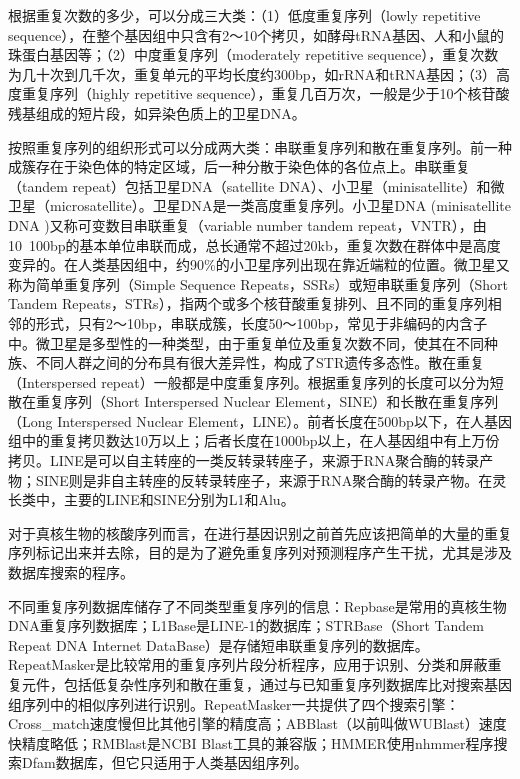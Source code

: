 根据重复次数的多少，可以分成三大类：（1）低度重复序列（lowly repetitive sequence），在整个基因组中只含有2～10个拷贝，如酵母tRNA基因、人和小鼠的珠蛋白基因等；（2）中度重复序列（moderately repetitive sequence），重复次数为几十次到几千次，重复单元的平均长度约300bp，如rRNA和tRNA基因；（3）高度重复序列（highly repetitive sequence），重复几百万次，一般是少于10个核苷酸残基组成的短片段，如异染色质上的卫星DNA。

按照重复序列的组织形式可以分成两大类：串联重复序列和散在重复序列。前一种成簇存在于染色体的特定区域，后一种分散于染色体的各位点上。串联重复（tandem repeat）包括卫星DNA（satellite DNA）、小卫星（minisatellite）和微卫星（microsatellite）。卫星DNA是一类高度重复序列。小卫星DNA (minisatellite DNA )又称可变数目串联重复（variable number tandem repeat，VNTR），由10~100bp的基本单位串联而成，总长通常不超过20kb，重复次数在群体中是高度变异的。在人类基因组中，约90\%的小卫星序列出现在靠近端粒的位置。微卫星又称为简单重复序列（Simple Sequence Repeats，SSRs）或短串联重复序列（Short Tandem Repeats，STRs），指两个或多个核苷酸重复排列、且不同的重复序列相邻的形式，只有2～10bp，串联成簇，长度50～100bp，常见于非编码的内含子中。微卫星是多型性的一种类型，由于重复单位及重复次数不同，使其在不同种族、不同人群之间的分布具有很大差异性，构成了STR遗传多态性。散在重复（Interspersed repeat）一般都是中度重复序列。根据重复序列的长度可以分为短散在重复序列（Short Interspersed Nuclear Element，SINE）和长散在重复序列（Long Interspersed Nuclear Element，LINE）。前者长度在500bp以下，在人基因组中的重复拷贝数达10万以上；后者长度在1000bp以上，在人基因组中有上万份拷贝。LINE是可以自主转座的一类反转录转座子，来源于RNA聚合酶的转录产物；SINE则是非自主转座的反转录转座子，来源于RNA聚合酶的转录产物。在灵长类中，主要的LINE和SINE分别为L1和Alu。 

对于真核生物的核酸序列而言，在进行基因识别之前首先应该把简单的大量的重复序列标记出来并去除，目的是为了避免重复序列对预测程序产生干扰，尤其是涉及数据库搜索的程序。

不同重复序列数据库储存了不同类型重复序列的信息：Repbase是常用的真核生物DNA重复序列数据库；L1Base是LINE-1的数据库；STRBase（Short Tandem Repeat DNA Internet DataBase）是存储短串联重复序列的数据库。RepeatMasker是比较常用的重复序列片段分析程序，应用于识别、分类和屏蔽重复元件，包括低复杂性序列和散在重复，通过与已知重复序列数据库比对搜索基因组序列中的相似序列进行识别。RepeatMasker一共提供了四个搜索引擎：Cross\_match速度慢但比其他引擎的精度高；ABBlast（以前叫做WUBlast）速度快精度略低；RMBlast是NCBI Blast工具的兼容版；HMMER使用nhmmer程序搜索Dfam数据库，但它只适用于人类基因组序列。

